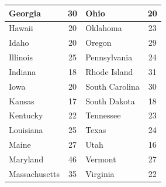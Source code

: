 \documentclass{article}
\begin{document}
\begin{table}[]
\begin{tabular}{|l|c|l|c|}
		Georgia       & 30                                                                & Ohio           & 20                                                                \\ \hline
		Hawaii        & 20                                                                & Oklahoma       & 23                                                                \\ \hline
		Idaho         & 20                                                                & Oregon         & 29                                                                \\ \hline
		Illinois      & 25                                                                & Pennsylvania   & 24                                                                \\ \hline
		Indiana       & 18                                                                & Rhode Island   & 31                                                                \\ \hline
		Iowa          & 20                                                                & South Carolina & 30                                                                \\ \hline
		Kansas        & 17                                                                & South Dakota   & 18                                                                \\ \hline
		Kentucky      & 22                                                                & Tennessee      & 23                                                                \\ \hline
		Louisiana     & 25                                                                & Texas          & 24                                                                \\ \hline
		Maine         & 27                                                                & Utah           & 16                                                                \\ \hline
		Maryland      & 46                                                                & Vermont        & 27                                                                \\ \hline
		Massachusetts & 35                                                                & Virginia       & 22                                                                \\ \hline

\end{tabular}
\end{table}
\end{document}
